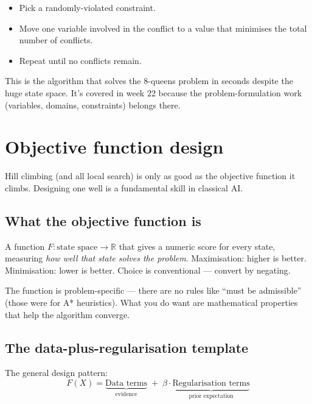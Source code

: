 \documentclass[11pt, a4paper]{article}
\begin{document}
\begin{itemize}
  \item Pick a randomly-violated constraint.
  \item Move one variable involved in the conflict to a value that minimises the total number of conflicts.
  \item Repeat until no conflicts remain.
\end{itemize}

This is the algorithm that solves the 8-queens problem in seconds despite the huge state space. It's covered in week 22 because the problem-formulation work (variables, domains, constraints) belongs there.

\section{Objective function design}

Hill climbing (and all local search) is only as good as the objective function it climbs. Designing one well is a fundamental skill in classical AI.

\subsection{What the objective function is}

\begin{defbox}
A function $F : \text{state space} \to \mathbb{R}$ that gives a numeric score for every state, measuring \emph{how well that state solves the problem}. Maximisation: higher is better. Minimisation: lower is better. Choice is conventional — convert by negating.
\end{defbox}

The function is problem-specific — there are no rules like ``must be admissible'' (those were for A* heuristics). What you do want are mathematical properties that help the algorithm converge.

\subsection{The data-plus-regularisation template}

The general design pattern:
\[
F(X) = \underbrace{\text{Data terms}}_{\text{evidence}} \;+\; \beta \cdot \underbrace{\text{Regularisation terms}}_{\text{prior expectation}}
\]
\end{document}
